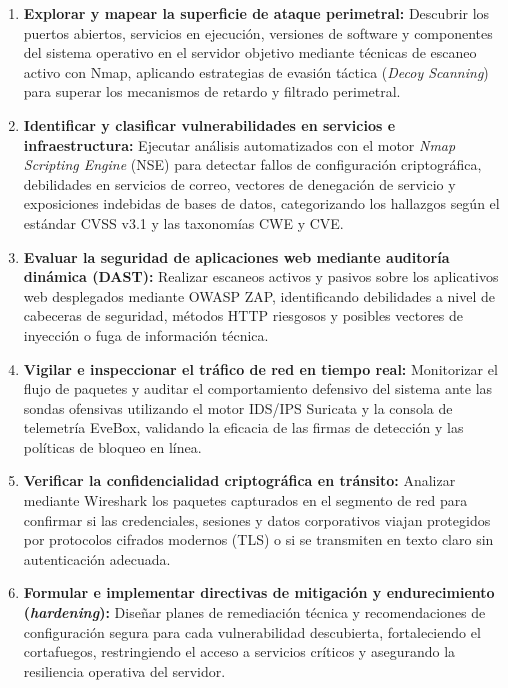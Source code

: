 \begin{enumerate}
  \item \textbf{Explorar y mapear la superficie de ataque perimetral:} Descubrir los puertos abiertos, servicios en ejecución, versiones de software y componentes del sistema operativo en el servidor objetivo mediante técnicas de escaneo activo con Nmap, aplicando estrategias de evasión táctica (\textit{Decoy Scanning}) para superar los mecanismos de retardo y filtrado perimetral.
  
  \item \textbf{Identificar y clasificar vulnerabilidades en servicios e infraestructura:} Ejecutar análisis automatizados con el motor \textit{Nmap Scripting Engine} (NSE) para detectar fallos de configuración criptográfica, debilidades en servicios de correo, vectores de denegación de servicio y exposiciones indebidas de bases de datos, categorizando los hallazgos según el estándar CVSS v3.1 y las taxonomías CWE y CVE.
  
  \item \textbf{Evaluar la seguridad de aplicaciones web mediante auditoría dinámica (DAST):} Realizar escaneos activos y pasivos sobre los aplicativos web desplegados mediante OWASP ZAP, identificando debilidades a nivel de cabeceras de seguridad, métodos HTTP riesgosos y posibles vectores de inyección o fuga de información técnica.
  
  \item \textbf{Vigilar e inspeccionar el tráfico de red en tiempo real:} Monitorizar el flujo de paquetes y auditar el comportamiento defensivo del sistema ante las sondas ofensivas utilizando el motor IDS/IPS Suricata y la consola de telemetría EveBox, validando la eficacia de las firmas de detección y las políticas de bloqueo en línea.
  
  \item \textbf{Verificar la confidencialidad criptográfica en tránsito:} Analizar mediante Wireshark los paquetes capturados en el segmento de red para confirmar si las credenciales, sesiones y datos corporativos viajan protegidos por protocolos cifrados modernos (TLS) o si se transmiten en texto claro sin autenticación adecuada.
  
  \item \textbf{Formular e implementar directivas de mitigación y endurecimiento (\textit{hardening}):} Diseñar planes de remediación técnica y recomendaciones de configuración segura para cada vulnerabilidad descubierta, fortaleciendo el cortafuegos, restringiendo el acceso a servicios críticos y asegurando la resiliencia operativa del servidor.
\end{enumerate}

